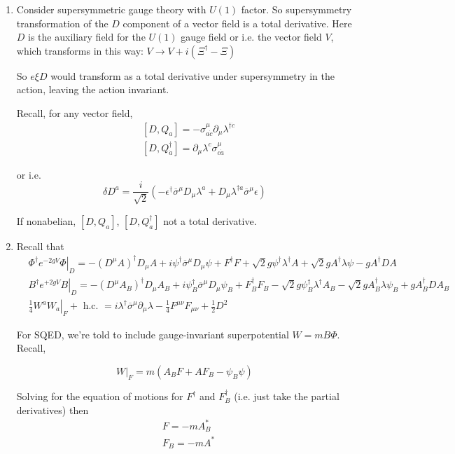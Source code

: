 \documentclass[twoside]{amsart}
\newcommand{\problemhead}[1]
  {\smallskip
   \noindent{\large\bf Problem #1.}
   }
\begin{document}
\problemhead{95.5} 
\begin{enumerate}
\item[(a)] Consider supersymmetric gauge theory with $U(1)$ factor.  So supersymmetry transformation of the $D$ component of a vector field is a total derivative.  Here $D$ is the auxiliary field for the $U(1)$ gauge field or i.e. the vector field $V$, which transforms in this way: $V \to V + i (\Xi^{\dag} - \Xi)$ 

So $e \xi D$ would transform as a total derivative under supersymmetry in the action, leaving the action invariant.  

Recall, for any vector field, 
\[
\begin{aligned}
  & [D, Q_a] = - \sigma_{a\dot{c}}^{\mu} \partial_{\mu} \lambda^{\dag \dot{c}} \\ 
  &  [D, Q_{\dot{a}}^{\dag} ] = \partial_{\mu} \lambda^c \sigma^{\mu}_{c\dot{a}}
\end{aligned}
\]

or i.e. 
\[
\delta D^a = \frac{i}{\sqrt{2}} ( - \epsilon^{\dag} \overline{\sigma}^{\mu} D_{\mu } \lambda^a + D_{\mu} \lambda^{\dag a} \overline{\sigma}^{\mu} \epsilon )
\]

If nonabelian, $[D,Q_a]$, $[D,Q^{\dag}_{\dot{a}}]$ not a total derivative.  
\item[(b)] Recall that 
\[
\begin{aligned}
  & \left. \Phi^{\dag} e^{-2gV } \Phi \right|_D = - ( D^{\mu} A)^{\dag} D_{\mu} A + i \psi^{\dag} \overline{\sigma}^{\mu} D_{\mu} \psi + F^{\dag} F + \sqrt{2} g \psi^{\dag} \lambda^{\dag} A + \sqrt{2} g A^{\dag} \lambda \psi - g A^{\dag} DA \\  
  & \left. B^{\dag} e^{+2gV} B \right|_D = - ( D^{\mu} A_B)^{\dag} D_{\mu} A_B + i \psi_B^{\dag} \overline{\sigma}^{\mu} D_{\mu} \psi_B + F^{\dag}_B F_B - \sqrt{2} g \psi^{\dag}_B \lambda^{\dag} A_B  - \sqrt{2} g A_B^{\dag} \lambda \psi_B + gA^{\dag}_B D A_B  \\
  & \left. \frac{1}{4} W^a W_a \right|_F + \text{ h.c. } = i \lambda^{\dag} \overline{\sigma}^{\mu} \partial_{\mu} \lambda - \frac{1}{4} F^{\mu \nu} F_{\mu \nu} + \frac{1}{2} D^2
\end{aligned}
\]


For SQED, we're told to include gauge-invariant superpotential $W = m B \Phi$.  Recall, 

\[
\left. W \right|_F = m ( A_B F + AF_B - \psi_B \psi)
\]

Solving for the equation of motions for $F^{\dag}$ and $F_B^{\dag}$ (i.e. just take the partial derivatives) then 
\[
\begin{aligned}
  & F = - mA^*_B \\ 
  & F_B = - mA^*
\end{aligned}
\]


\end{enumerate}
\end{document}
